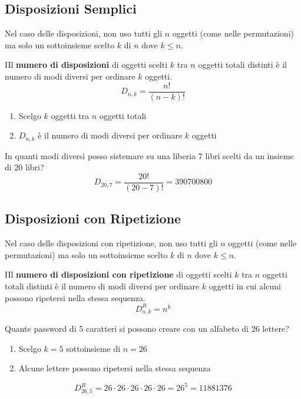 \documentclass{article}  %
\theoremstyle{definition}
\begin{document}
\subsection{Disposizioni Semplici}
Nel caso delle disposizioni, non uso tutti gli $n$ oggetti (come nelle permutazioni) ma solo un sottoinsieme scelto $k$ di $n$ dove $k \leq n$.
\begin{theorem}{}
	IIl \textbf{numero di disposizioni} di oggetti scelti $k$ tra $n$ oggetti totali distinti è il
	numero di modi diversi per ordinare $k$ oggetti.
	\[
		D_{n,k}=\frac{n!}{(n-k)!}
	\]
	\begin{enumerate}
		\item Scelgo $k$ oggetti tra $n$ oggetti totali
		\item $D_{n,k}$ è il numero di modi diversi per ordinare $k$ oggetti
	\end{enumerate}
\end{theorem}

\begin{esercizio}[Esempio]
	In quanti modi diversi posso sistemare su una liberia 7 libri scelti da un insieme di 20 libri?
	\[
		D_{20,7}=\frac{20!}{(20-7)!}=390700800
	\]
\end{esercizio}

\subsection{Disposizioni con Ripetizione}
Nel caso delle disposizioni con ripetizione, non uso tutti gli $n$ oggetti (come nelle permutazioni) ma solo un sottoinsieme scelto $k$ di $n$ dove $k \leq n$.
\begin{theorem}{}
	IIl \textbf{numero di disposizioni con ripetizione} di oggetti scelti $k$ tra $n$ oggetti totali distinti è il
	numero di modi diversi per ordinare $k$ oggetti in cui alcuni possono ripetersi nella stessa sequenza.
	\[
		D_{n,k}^R=n^k
	\]
\end{theorem}

\begin{esercizio}[Esempio]
	Quante password di 5 caratteri si possono creare con un alfabeto di 26 lettere?
	\begin{enumerate}
		\item Scelgo $k=5$ sottoinsieme di $n=26$
		\item Alcune lettere possono ripetersi nella stessa sequenza
	\end{enumerate}
	\[
		D_{26,5}^R=26\cdot26\cdot26\cdot26\cdot26=26^5=11881376
	\]
\end{esercizio}
\end{document}
